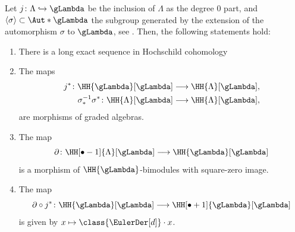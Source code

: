 \documentclass[a4paper]{amsart}
\begin{document}
\begin{proposition}
  \label{prop:long_ex_seqHH}
  Let $j\colon\Lambda\hookrightarrow\gLambda$ be the inclusion of $\Lambda$ as
  the degree $0$ part, and $\langle\sigma\rangle\subset \Aut*{\gLambda}$ the
  subgroup generated by the extension of the automorphism $\sigma$ to
  $\gLambda$, see . Then, the following statements hold:
  \begin{enumerate}
  \item There is a long exact sequence in Hochschild
    cohomology
    \begin{center}
    \end{center}
  \item The maps
    \[
      \begin{split}
        j^*\colon\HH{\gLambda}[\gLambda]&\longrightarrow\HH{\Lambda}[\gLambda],\\
        \sigma_*^{-1}\sigma^*\colon \HH{\Lambda}[\gLambda]&\longrightarrow\HH{\Lambda}[\gLambda],
      \end{split}
    \]
    are morphisms of graded algebras.
  \item The map
    \[
      \partial\colon\HH[\bullet-1]{\Lambda}[\gLambda]\longrightarrow\HH{\gLambda}[\gLambda] \]
    is a morphism of $\HH{\gLambda}$-bimodules with square-zero image. \item The
    map
    \[
      \partial\circ
      j^*\colon\HH{\gLambda}[\gLambda]\longrightarrow\HH[\bullet+1]{\gLambda}[\gLambda]
    \] is given by $x\mapsto\class{\EulerDer[d]}\cdot x$.
  \end{enumerate}
\end{proposition}
\end{document}
